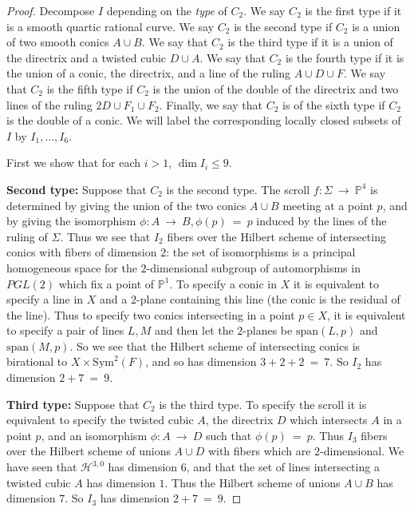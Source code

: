 \documentclass[twoside,12pt,reqno]{amsart}
\theoremstyle{plain}
\theoremstyle{definition}
\newcommand{\Hdg}[2]{\mathcal{H}^{#1,#2}}
\newcommand{\PP}{\mathbb{P}}
\def\ps{\vspace{4pt}}
\begin{document}
\begin{proof}
Decompose $I$ depending
on the \emph{type} of $C_2$.  We say $C_2$ is the first type if
it is a smooth quartic rational curve.  We say $C_2$ is the
second type if $C_2$ is a union of two smooth conics $A\cup B$.  We
say that 
$C_2$ is the third type if it is a union of the directrix and a
twisted cubic $D\cup A$.  We say that $C_2$ is the fourth type if it
is the 
union of a conic, the directrix, and a line of the ruling  $A\cup D\cup
F$.  We say
that $C_2$ is the fifth type if $C_2$ is the union of the double of
the directrix and two lines of the ruling $2D\cup F_1\cup F_2$.  Finally,
we say that $C_2$ is 
of the sixth type if $C_2$ is the double of a conic.  We will label
the corresponding locally closed subsets of $I$ by $I_1,\dots, I_6$.

\ps

First we show that for each $i> 1$, $\dim I_i \leq 9$.

\ps

\textbf{Second type:}
Suppose
that $C_2$ is the second type.  The scroll $f:\Sigma~\rightarrow~
\PP^4$ is determined by giving the union of the two conics $A\cup
B$ meeting at a point $p$, and by giving the isomorphism
$\phi:A~\rightarrow~ B, \phi(p)~=~p$ induced by the lines of the ruling of
$\Sigma$.  Thus we see that $I_2$ fibers over the Hilbert scheme of
intersecting conics with fibers of dimension $2$: the set of
isomorphisms is a principal homogeneous space for the $2$-dimensional
subgroup of automorphisms in $PGL(2)$ which fix a point of $\PP^1$.
To specify a conic
in $X$ it is equivalent to specify a line in $X$ and a $2$-plane
containing this line (the conic is the residual of the line).  Thus to
specify two conics intersecting in a point $p\in X$, it is equivalent
to specify a pair of lines $L,M$ and then let the $2$-planes be
$\text{span}(L,p)$ and $\text{span}(M,p)$.  So we see that the Hilbert
scheme of intersecting conics is birational to $X\times
\text{Sym}^2(F)$, and so has dimension $3+2+2~=~7$.  So $I_2$ has
dimension $2+7~=~9$.  

\ps

\textbf{Third type:}
Suppose that $C_2$ is the third type.  To specify the scroll it is
equivalent to specify the twisted cubic $A$, the directrix $D$ which
intersects $A$ in a point $p$, and an isomorphism $\phi:A~\rightarrow~
D$ such that $\phi(p)~=~p$.  Thus $I_3$ fibers over the Hilbert scheme
of unions $A\cup D$ with fibers which are $2$-dimensional.  We have
seen that $\Hdg{3}{0}$ has dimension $6$,  and that the set of lines
intersecting a twisted cubic $A$ has dimension $1$.  Thus the Hilbert
scheme of unions $A\cup B$ has dimension $7$.  So $I_3$ has dimension
$2+7~=~9$.


\end{proof}
\end{document}
